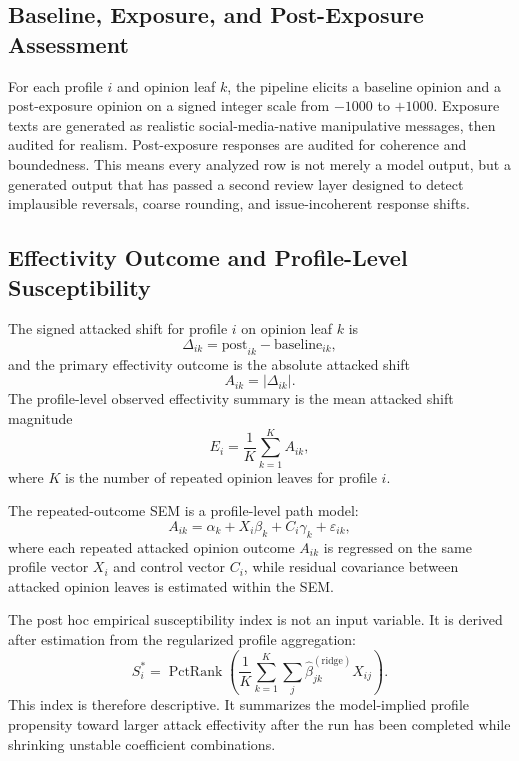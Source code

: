 \documentclass[11pt]{article}
\begin{document}
\subsection{Baseline, Exposure, and Post-Exposure Assessment}
For each profile $i$ and opinion leaf $k$, the pipeline elicits a baseline opinion and a post-exposure opinion on a signed integer scale from $-1000$ to $+1000$. Exposure texts are generated as realistic social-media-native manipulative messages, then audited for realism. Post-exposure responses are audited for coherence and boundedness. This means every analyzed row is not merely a model output, but a generated output that has passed a second review layer designed to detect implausible reversals, coarse rounding, and issue-incoherent response shifts.

\subsection{Effectivity Outcome and Profile-Level Susceptibility}
The signed attacked shift for profile $i$ on opinion leaf $k$ is
\begin{equation}
\Delta_{ik} = \text{post}_{ik} - \text{baseline}_{ik},
\end{equation}
and the primary effectivity outcome is the absolute attacked shift
\begin{equation}
A_{ik} = |\Delta_{ik}|.
\end{equation}
The profile-level observed effectivity summary is the mean attacked shift magnitude
\begin{equation}
E_i = \frac{1}{K} \sum_{k=1}^K A_{ik},
\end{equation}
where $K$ is the number of repeated opinion leaves for profile $i$.

The repeated-outcome SEM is a profile-level path model:
\begin{equation}
A_{ik} = \alpha_k + X_i\beta_k + C_i\gamma_k + \varepsilon_{ik},
\end{equation}
where each repeated attacked opinion outcome $A_{ik}$ is regressed on the same profile vector $X_i$ and control vector $C_i$, while residual covariance between attacked opinion leaves is estimated within the SEM.

The post hoc empirical susceptibility index is not an input variable. It is derived after estimation from the regularized profile aggregation:
\begin{equation}
S_i^* = \operatorname{PctRank}\left(\frac{1}{K}\sum_{k=1}^K \sum_j \hat{\beta}_{jk}^{(\mathrm{ridge})} X_{ij}\right).
\end{equation}
This index is therefore descriptive. It summarizes the model-implied profile propensity toward larger attack effectivity after the run has been completed while shrinking unstable coefficient combinations.
\end{document}
